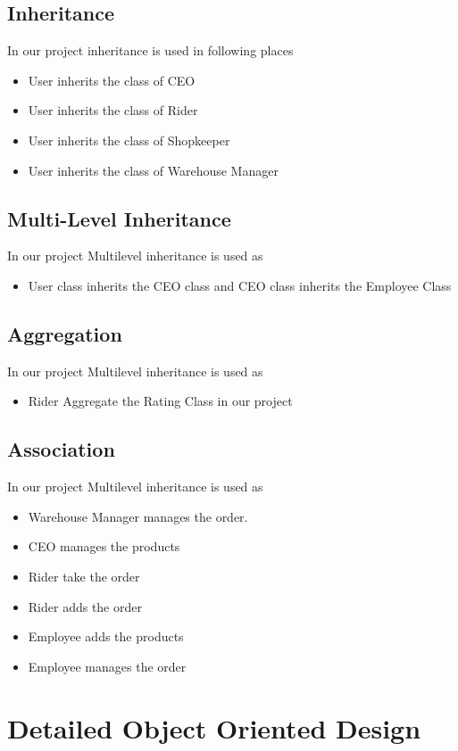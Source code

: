 \documentclass[12pt,a4paper]{report}
\begin{document}
\section{Inheritance}
In our project inheritance is used in following places
\begin{itemize}
\item   User inherits the class of CEO
\item User inherits the class of Rider 
\item User inherits the class of Shopkeeper
\item User inherits the class of Warehouse Manager  
\end{itemize}
\section{Multi-Level Inheritance}
In our project Multilevel inheritance is used as
\begin{itemize}
\item User class inherits the CEO class and CEO class inherits the Employee Class
\end{itemize}
\section{Aggregation}
In our project Multilevel inheritance is used as
\begin{itemize}
\item Rider Aggregate the Rating Class in our project
\end{itemize}
\section{Association}
In our project Multilevel inheritance is used as
\begin{itemize}
\item Warehouse Manager manages the order.
\item CEO manages the products
\item Rider take the order 
\item Rider adds the order
\item Employee adds the products
\item Employee manages the order 
\end{itemize}


\newpage
\chapter {Detailed Object Oriented Design}
\end{document}
